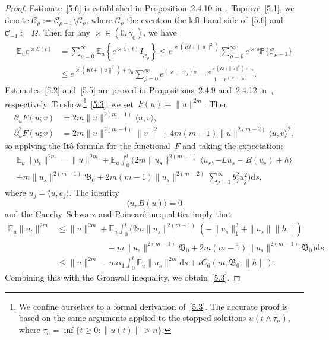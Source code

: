 \documentclass[10pt]{amsart}
\theoremstyle{definition}\newtheorem{defi}[theo]{Definition}\newtheorem{rema}[theo]{Remark}\newtheorem{exam}[theo]{Example}\newtheorem{exem}[theo]{Example}\newtheorem{nota}[theo]{Notation}
\newcommand{\p}{\partial}
\newcommand{\pP}{{\mathbb P}}
\newcommand{\E}{{\mathbb E}}
\newcommand{\CC}{{\mathcal C}}
\newcommand{\EE}{{\mathcal E}}
\newcommand{\vk}{{\varkappa}}
\newcommand{\ty}{\infty}
\newcommand{\BBBB}{{\mathfrak B}}
\newcommand{\lag}{\langle}
\newcommand{\rag}{\rangle}
\newcommand{\dd}{\mathrm{d}}
\begin{document}
\begin{proof}
Estimate~\eqref{5.6} is established in Proposition~2.4.10 in~\cite{KS-book}. To\linebreak prove~\eqref{5.1}, we denote $\tilde\CC_\rho:=\CC_{\rho-1}\setminus\CC_\rho $, where $\CC_\rho$ the event on the left-hand side of~\eqref{5.6} and $\CC_{-1}:=\Omega$. Then for any $\vk\in (0,\gamma_0)$, we have
\begin{align*}
\E_u e^{\varkappa \EE(t)} &= \sum_{\rho=0}^\ty\E_u \left\{e^{\varkappa \EE(t)} I_{\tilde \CC_\rho}\right\}\le e^{\varkappa(Kt+\|u\|^2)}
\sum_{\rho=0}^\ty e^{\varkappa \rho} \pP\{ \CC_{\rho-1}\} \\&\le e^{\varkappa(Kt+\|u\|^2)+\gamma_0}
\sum_{\rho=0}^\ty e^{(\varkappa-\gamma_0) \rho} = \frac{e^{\varkappa(Kt+\|u\|^2)+\gamma_0}}{ 1 -e^{(\varkappa-\gamma_0) }}.
\end{align*}
Estimates~\eqref{5.2} and~\eqref{5.5} are proved in Propositions~2.4.9 and~2.4.12 in~\cite{KS-book}, respectively. To show\,\footnote{We confine ourselves to a formal derivation of~\eqref{5.3}. The accurate proof is based on the same arguments applied to the stopped solutions $u(t\wedge \tau_n)$, where $\tau_n=\inf\{t\ge0: \|u(t)\|> n\}$.}~\eqref{5.3}, we set~$F(u)= \|u\|^{2m}$. Then
\begin{align*}
\p_u F(u;v)&=2m \|u\|^{2(m-1)} \lag u,v\rag,\\
\p^2_u F(u;v)&= 2m\|u\|^{2(m-1)} \|v\|^2+4m(m-1)\|u\|^{2(m-2)} \lag u,v\rag^2,
\end{align*}
so applying the It\^o formula for the functional~$F$ and taking the expectation:
\begin{multline*}
\E_u\|u_t\|^{2m}=\|u\|^{2m}+\E_u\int_0^t \Bigg(2m\|u_s\|^{2(m-1)}\lag u_s, -L u_s-B(u_s)+h\rag\\
+ m \|u_s\|^{2(m-1)} \BBBB_{0}+2m(m-1)\|u_s\|^{2(m-2)} \sum_{j=1}^\ty b_j^2u_j^2
\Bigg)\dd s,
\end{multline*}
where $u_j=\lag u, e_j\rag$. The identity
\begin{equation}\label{5.7}
\lag u, B(u)\rag=0
\end{equation}
and the Cauchy--Schwarz and Poincar\'e inequalities imply that
\begin{align*}
\E_u\|u_t\|^{2m}&\le\|u\|^{2m}+\E_u\int_0^t \big(2m\|u_s\|^{2(m-1)}(-\|u_s\|_1^2+\| u_s\|\|h\|) \\
&\qquad\qquad\qquad+ m \|u_s\|^{2(m-1)} \BBBB_{0}+2m(m-1)\|u_s\|^{2(m-1)} \BBBB_{0}\big)\dd s\\
&\le\|u\|^{2m}-m\alpha_1 \int_0^t \E_u\|u_s\|^{2m}\dd s +tC_6(m,\BBBB_{0},\|h\|).
\end{align*}
Combining this with the Gronwall inequality, we obtain~\eqref{5.3}.


\end{proof}
\end{document}
